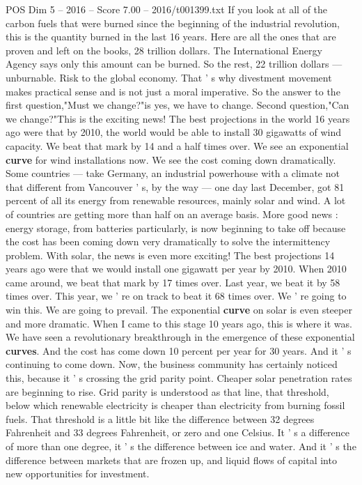 \begin{textsample}{POS Dim 5 – 2016 – Score 7.00 – 2016/t001399.txt}
If you look at all of the carbon fuels that were burned since the beginning of the industrial revolution, this is the quantity burned in the last 16 years.
Here are all the ones that are proven and left on the books, 28 trillion dollars.
The International Energy Agency says only this amount can be burned.
So the rest, 22 trillion dollars — unburnable.
Risk to the global economy.
That ' s why divestment movement makes practical sense and is not just a moral imperative.
So the answer to the first question,"Must we change?"is yes, we have to change.
Second question,"Can we change?"This is the exciting news!
The best projections in the world 16 years ago were that by 2010, the world would be able to install 30 gigawatts of wind capacity.
We beat that mark by 14 and a half times over.
We see an exponential \textbf{curve} for wind installations now.
We see the cost coming down dramatically.
Some countries — take Germany, an industrial powerhouse with a climate not that different from Vancouver ' s, by the way — one day last December, got 81 percent of all its energy from renewable resources, mainly solar and wind.
A lot of countries are getting more than half on an average basis.
More good news : energy storage, from batteries particularly, is now beginning to take off because the cost has been coming down very dramatically to solve the intermittency problem.
With solar, the news is even more exciting!
The best projections 14 years ago were that we would install one gigawatt per year by 2010.
When 2010 came around, we beat that mark by 17 times over.
Last year, we beat it by 58 times over.
This year, we ' re on track to beat it 68 times over.
We ' re going to win this.
We are going to prevail.
The exponential \textbf{curve} on solar is even steeper and more dramatic.
When I came to this stage 10 years ago, this is where it was.
We have seen a revolutionary breakthrough in the emergence of these exponential \textbf{curves}.
And the cost has come down 10 percent per year for 30 years.
And it ' s continuing to come down.
Now, the business community has certainly noticed this, because it ' s crossing the grid parity point.
Cheaper solar penetration rates are beginning to rise.
Grid parity is understood as that line, that threshold, below which renewable electricity is cheaper than electricity from burning fossil fuels.
That threshold is a little bit like the difference between 32 degrees Fahrenheit and 33 degrees Fahrenheit, or zero and one Celsius.
It ' s a difference of more than one degree, it ' s the difference between ice and water.
And it ' s the difference between markets that are frozen up, and liquid flows of capital into new opportunities for investment.

\end{textsample}
